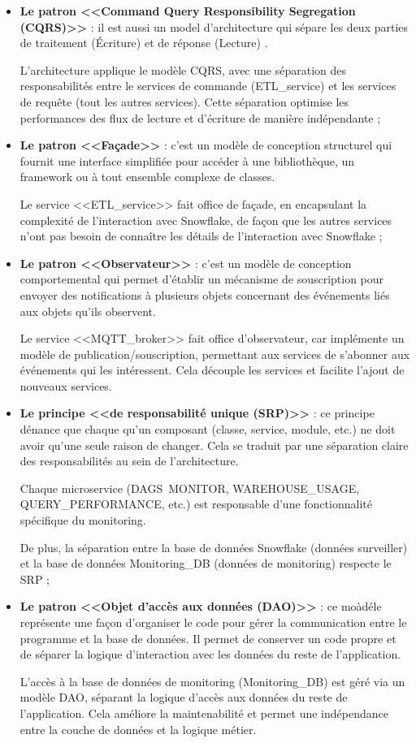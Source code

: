 \begin{itemize}
    \item \textbf{Le patron <<Command Query Responsibility Segregation (CQRS)>>} : il est aussi un model d'architecture qui sépare les deux parties de traitement (Écriture) et de réponse (Lecture) \cite{CQRS}.
    \par L'architecture applique le modèle CQRS, avec une séparation des responsabilités entre le services de commande (ETL\_service) et les services de requête (tout les autres services).
    Cette séparation optimise les performances des flux de lecture et d'écriture de manière indépendante ; \\
    \item \textbf{Le patron <<Façade>>} : c'est un modèle de conception structurel qui fournit une interface simplifiée pour accéder à une bibliothèque, 
    un framework ou à tout ensemble complexe de classes\cite{facade}.
    \par Le service <<ETL\_service>> fait office de façade, en encapsulant la complexité de l'interaction avec Snowflake, 
    de façon que les autres services n'ont pas besoin de connaître les détails de l'interaction avec Snowflake ; \\
    \item \textbf{Le patron <<Observateur>>} : c'est un modèle de conception comportemental qui permet d'établir un mécanisme de souscription pour envoyer des notifications à plusieurs objets concernant des événements liés aux objets qu'ils observent\cite{observer}.
    \par Le service <<MQTT\_broker>> fait office d'observateur, car implémente un modèle de publication/souscription, permettant aux services de s'abonner aux événements qui les intéressent.
    Cela découple les services et facilite l'ajout de nouveaux services.
    \item \textbf{Le principe <<de responsabilité unique (SRP)>>} : ce principe dénance que chaque qu'un composant (classe, service, module, etc.) ne doit avoir qu'une seule raison de changer. 
    Cela se traduit par une séparation claire des responsabilités au sein de l'architecture\cite{SRP}.
    \par Chaque microservice (DAGS\ MONITOR, WAREHOUSE\_USAGE, QUERY\_PERFORMANCE, etc.) est responsable d'une fonctionnalité spécifique du monitoring.
   \par De plus, la séparation entre la base de données Snowflake (données surveiller) et la base de données Monitoring\_DB (données de monitoring) respecte le SRP ; \\
    \item \textbf{Le patron <<Objet d'accès aux données (DAO)>>} : ce moàdéle représente une façon d'organiser le code pour gérer la communication entre le programme et la base de données.
    Il permet de conserver un code propre et de séparer la logique d'interaction avec les données du reste de l'application\cite{DAO}.
    \par L'accès à la base de données de monitoring (Monitoring\_DB) est géré via un modèle DAO, séparant la logique d'accès aux données du reste de l'application.
    Cela améliore la maintenabilité et permet une indépendance entre la couche de données et la logique métier.
\end{itemize}
